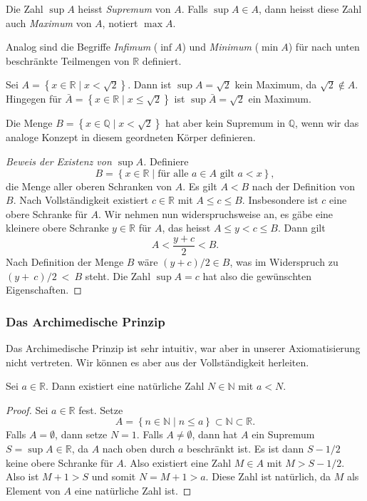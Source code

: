\documentclass[../main.tex]{subfiles}
\begin{document}
Die Zahl $\sup A$ heisst \textit{Supremum} von $A$. Falls
$\sup A \in A$, dann heisst diese Zahl auch \textit{Maximum} von $A$,
notiert $\max A$.

Analog sind die Begriffe \textit{Infimum} ($\inf A$) und
\textit{Minimum} ($\min A$) für nach unten beschränkte
Teilmengen von $\mathbb{R}$ definiert.
 
\begin{example}
  Sei $A = \left\{x \in \mathbb{R} \mid x < \sqrt 2\right\}$.
  Dann ist $\sup A = \sqrt 2$ kein Maximum, da $\sqrt 2 \notin A$.
  Hingegen für 
  $\bar A = \left\{x \in \mathbb{R} \mid x \leq \sqrt 2\right\}$
  ist $\sup \bar A = \sqrt 2$ ein Maximum.

  Die Menge $B = \left\{x \in \mathbb{Q} \mid x < \sqrt 2\right\}$
  hat aber kein Supremum in $\mathbb{Q}$, wenn wir das analoge
  Konzept in diesem 
  geordneten Körper definieren. 
\end{example}

\begin{proof}[Beweis der Existenz von $\sup A$]
  Definiere
  \[
	  B = \left\{x \in \mathbb{R} \mid \text{für alle } a \in A
  \text{ gilt } a < x\right\},
  \]
  die Menge aller oberen Schranken von $A$. Es gilt $A < B$
  nach der Definition von $B$.
  Nach Vollständigkeit existiert $c \in \mathbb{R}$
  mit $A \leq c \leq B$.
  Insbesondere ist $c$ eine obere Schranke für $A$.
  Wir nehmen nun widerspruchsweise an, es gäbe eine
  kleinere obere Schranke $y \in \mathbb{R}$ für $A$,
  das heisst $A \leq y < c \leq B$.
  Dann gilt
  \[
    A < \frac{y + c}{2} < B.
  \]
  Nach Definition der Menge $B$ wäre
  $(y + c)/2 \in B$, was im Widerspruch zu $(y +~c)/2~<~B$ steht.
  Die Zahl $\sup A = c$ hat also die gewünschten Eigenschaften.
\end{proof}

\subsubsection*{Das Archimedische Prinzip}
Das Archimedische Prinzip ist sehr intuitiv, war aber in
unserer Axiomatisierung nicht vertreten. Wir können
es aber aus der Vollständigkeit herleiten.

\begin{claim}
  Sei $a \in \mathbb{R}$. Dann existiert eine natürliche
  Zahl $N \in \mathbb{N}$ mit $a < N$.
\end{claim}

\begin{proof}
  Sei $a \in \mathbb{R}$ fest. Setze
  \[
    A = \left\{n \in \mathbb{N} \mid n \leq a\right\} \subset \mathbb{N}
    \subset \mathbb{R}.
  \]
  Falls $A = \emptyset$, dann setze $N = 1$.
  Falls $A \neq \emptyset$, dann hat $A$ ein Supremum
  $S = \sup A \in \mathbb{R}$, da $A$ nach oben 
  durch $a$ beschränkt ist.
  Es ist dann $S - 1/2$ keine obere Schranke für $A$. 
  Also existiert eine Zahl $M \in A$ mit $M > S - 1/2$.
  Also ist $M + 1 > S$ und somit $N = M + 1 > a$. Diese Zahl ist
  natürlich, da $M$ als Element von $A$ eine natürliche Zahl ist.
\end{proof}
\end{document}

